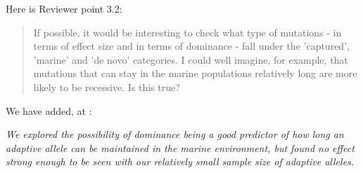 \bigskip

Here is Reviewer point 3.2:
\begin{quote}
If possible, it would be interesting to check what type of mutations - in terms of effect size and in terms of dominance - fall under the 'captured', 'marine' and 'de novo' categories. I could well imagine, for example, that mutations that can stay in the marine populations relatively long are more likely to be recessive. Is this true?
\end{quote}




We have added, at :

\textit{
We explored the possibility of dominance being a good predictor of
how long an adaptive allele can be maintained in the marine environment,
but found no effect strong enough to be seen with our relatively small sample size of adaptive alleles.
}
